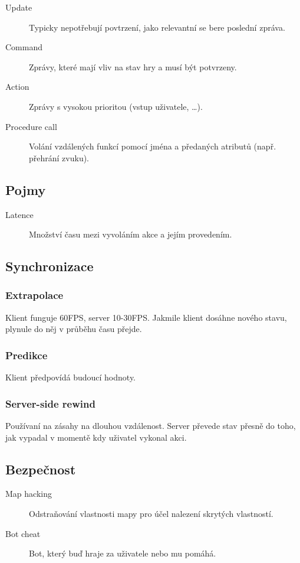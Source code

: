 \begin{description}
    \item[Update] Typicky nepotřebují povtrzení, jako relevantní se bere poslední zpráva.
    \item[Command] Zprávy, které mají vliv na stav hry a musí být potvrzeny.
    \item[Action] Zprávy s vysokou prioritou (vstup uživatele, \dots).
    \item[Procedure call] Volání vzdálených funkcí pomocí jména a předaných atributů (např. přehrání zvuku).
\end{description}

\subsection*{Pojmy}

\begin{description}
    \item[Latence] Množství času mezi vyvoláním akce a jejím provedením. 
\end{description}

\subsection*{Synchronizace}

\subsubsection*{Extrapolace}

Klient funguje 60FPS, server 10-30FPS.
Jakmile klient dosáhne nového stavu, plynule do něj v průběhu času přejde.

\subsubsection*{Predikce}

Klient předpovídá budoucí hodnoty.

\subsubsection*{Server-side rewind}

Používaní na zásahy na dlouhou vzdálenost.
Server převede stav přesně do toho, jak vypadal v momentě kdy uživatel vykonal akci.

\subsection*{Bezpečnost}

\begin{description}
    \item[Map hacking] Odstraňování vlastnosti mapy pro účel nalezení skrytých vlastností.
    \item[Bot cheat] Bot, který buď hraje za uživatele nebo mu pomáhá. 
\end{description}
